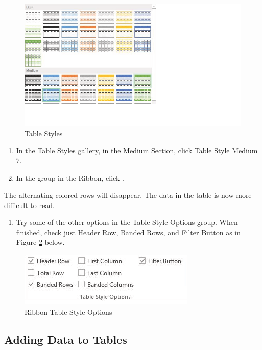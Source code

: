 \begin{figure}[H]
	\centering
	\includegraphics[width=\maxwidth{.95\linewidth}]{gfx/ch05_fig04}
	\caption{Table Styles}
	\label{05:fig04}
\end{figure}

\begin{enumerate}[resume]
	\item In the Table Styles gallery, in the Medium Section, click Table Style Medium $ 7 $.
	\item In the  group in the Ribbon, click .
\end{enumerate}

The alternating colored rows will disappear. The data in the table is now more difficult to read.

\begin{enumerate}
	\item Try some of the other options in the Table Style Options group. When finished, check just Header Row, Banded Rows, and Filter Button as in Figure \ref{05:fig05} below.
\end{enumerate}

\begin{figure}[H]
	\centering
	\includegraphics[width=\maxwidth{.95\linewidth}]{gfx/ch05_fig05}
	\caption{Ribbon Table Style Options}
	\label{05:fig05}
\end{figure}

\subsection{Adding Data to Tables}

